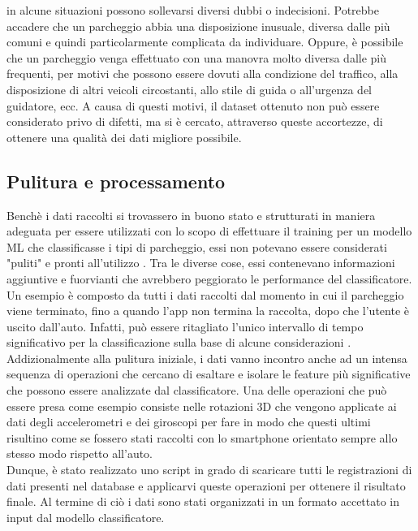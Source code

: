in alcune situazioni possono sollevarsi diversi dubbi o indecisioni. Potrebbe accadere che un parcheggio
abbia una disposizione inusuale, diversa dalle più comuni e quindi particolarmente complicata da
individuare. Oppure, è possibile che un parcheggio venga effettuato con una manovra molto diversa dalle
più frequenti, per motivi che possono essere dovuti alla condizione del traffico, alla disposizione di
altri veicoli circostanti, allo stile di guida o all'urgenza del guidatore, ecc. A causa di questi
motivi, il dataset ottenuto non può essere considerato privo di difetti, ma si è cercato, attraverso
queste accortezze, di ottenere una qualità dei dati \cite{data_quality_considerations} migliore possibile.

\subsection{Pulitura e processamento}

Benchè i dati raccolti si trovassero in buono stato e strutturati in maniera adeguata per 
essere utilizzati con lo scopo di effettuare il training per un modello ML che classificasse
i tipi di parcheggio, essi non potevano essere considerati "puliti" e pronti all'utilizzo 
\cite{data_cleaning}.
Tra le diverse cose, essi contenevano informazioni aggiuntive e fuorvianti che avrebbero
peggiorato le performance del classificatore. Un esempio è composto da tutti i dati raccolti
dal momento in cui il parcheggio viene terminato, fino a quando l'app non termina la raccolta,
dopo che l'utente è uscito dall'auto. Infatti, può essere ritagliato l'unico intervallo di
tempo significativo per la classificazione sulla base di alcune considerazioni
\cite{smartphone_placement_within_vehicles}.\\
Addizionalmente alla pulitura iniziale, i dati vanno incontro anche ad un intensa sequenza
di operazioni che cercano di esaltare e isolare le feature più significative 
\cite{data_preprocessing_supervised_learning} che possono
essere analizzate dal classificatore. Una delle operazioni che può essere presa come esempio 
consiste nelle rotazioni 3D \cite{applications_euler_rotation_angles} che vengono applicate 
ai dati degli accelerometri e dei giroscopi
per fare in modo che questi ultimi risultino come se fossero stati raccolti con lo smartphone
orientato sempre allo stesso modo rispetto all'auto.\\
Dunque, è stato realizzato uno script in grado di scaricare tutti le registrazioni di dati
presenti nel database e applicarvi queste operazioni per ottenere il risultato finale.
Al termine di ciò i dati sono stati organizzati in un formato accettato in input dal 
modello classificatore.


